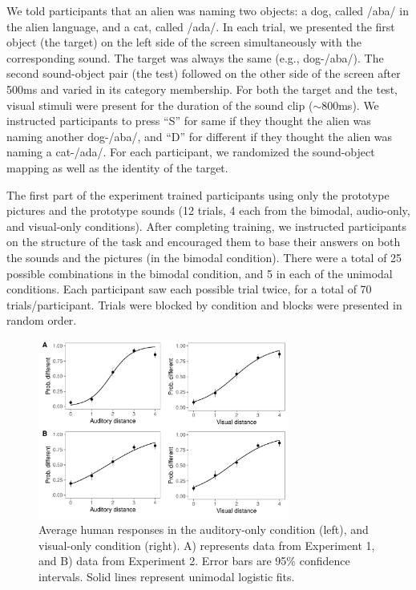 \documentclass[10pt,letterpaper]{article}
\begin{document}
We told participants that an alien was naming two objects: a dog, called /aba/ in the alien language, and a cat, called /ada/. In each trial, we presented the first object (the target) on the left side of the screen simultaneously with the corresponding sound. The target was always the same (e.g., dog-/aba/). The second sound-object pair (the test) followed on the other side of the screen after 500ms and varied in its category membership. For both the target and the test, visual stimuli were present for the duration of the sound clip ($\sim$800ms). We instructed participants to press ``S'' for same if they thought the alien was naming another dog-/aba/, and ``D'' for different if they thought the alien was naming a cat-/ada/. For each participant, we randomized the sound-object mapping as well as the identity of the target.

The first part of the experiment trained participants using only the prototype pictures and the prototype sounds (12 trials, 4 each from the bimodal, audio-only, and visual-only conditions). After completing training, we instructed participants on the structure of the task and encouraged them to base their answers on both the sounds and the pictures (in the bimodal condition). There were a total of 25 possible combinations in the bimodal condition, and 5 in each of the unimodal conditions. Each participant saw each possible trial twice, for a total of 70 trials/participant. Trials were blocked by condition and blocks were presented in random order.

\begin{figure}
\centering
\includegraphics[width=3.25in]{pictures/unimodal.pdf}
\caption{Average human responses in the auditory-only condition (left), and visual-only condition (right). A) represents data from Experiment 1, and B) data from Experiment 2. Error bars are 95\% confidence intervals. Solid lines represent unimodal logistic fits.}
\label{fig:unimodal}
\end{figure}
\end{document}
